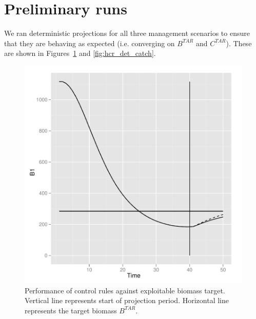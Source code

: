 \documentclass[a4paper]{article}
\begin{document}
\section{Preliminary runs}

We ran deterministic projections for all three management scenarios to ensure that they are behaving as expected (i.e. converging on $B^{TAR}$ and $C^{TAR}$).
These are shown in Figures~\ref{fig:hcr_det_biomass} and \ref{fig:hcr_det_catch}.








\begin{figure}
\centering
\includegraphics{script-019}
\caption{Performance of control rules against exploitable biomass target. Vertical line represents start of projection period. 
Horizontal line represents the target biomass $B^{TAR}$.}
\label{fig:hcr_det_biomass}
\end{figure}
\end{document}
